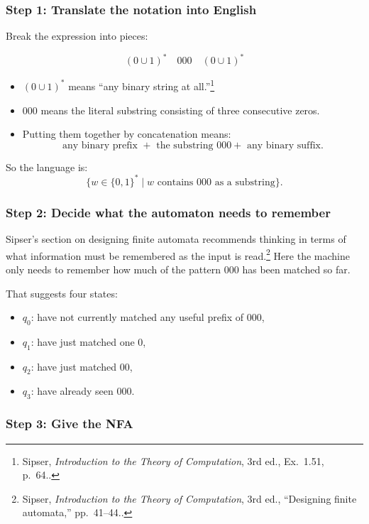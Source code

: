 \documentclass[12pt]{article}
\newcommand{\sipser}[1]{\footnote{Sipser, \emph{Introduction to the Theory of Computation}, 3rd ed., #1.}}
\begin{document}
\subsubsection*{Step 1: Translate the notation into English}

Break the expression into pieces:

\[
(0\cup 1)^* \quad 000 \quad (0\cup 1)^*
\]

\begin{itemize}[itemsep=0.4em]
    \item \((0\cup 1)^*\) means ``any binary string at all.''\sipser{Ex.~1.51, p.~64.}
    \item \(000\) means the literal substring consisting of three consecutive zeros.
    \item Putting them together by concatenation means:
    \[
    \text{any binary prefix } + \text{ the substring } 000 + \text{ any binary suffix}.
    \]
\end{itemize}

So the language is:
\[
\{w\in\{0,1\}^* \mid w \text{ contains } 000 \text{ as a substring}\}.
\]

\subsubsection*{Step 2: Decide what the automaton needs to remember}

Sipser's section on designing finite automata recommends thinking in terms of what information must be remembered as the input is read.\sipser{``Designing finite automata,'' pp.~41--44.} Here the machine only needs to remember how much of the pattern \(000\) has been matched so far.

That suggests four states:

\begin{itemize}[itemsep=0.3em]
    \item \(q_0\): have not currently matched any useful prefix of \(000\),
    \item \(q_1\): have just matched one \(0\),
    \item \(q_2\): have just matched \(00\),
    \item \(q_3\): have already seen \(000\).
\end{itemize}

\subsubsection*{Step 3: Give the NFA}
\end{document}

